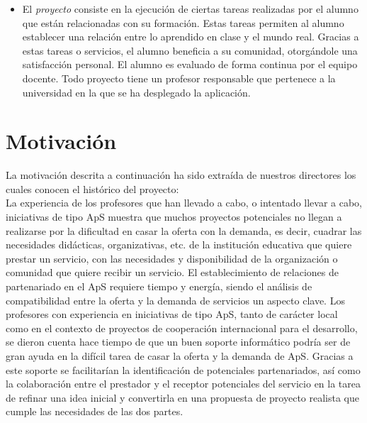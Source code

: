 \documentclass[11pt]{book}
\begin{document}
\begin{itemize}
		\item El \emph{proyecto} consiste en la ejecución de ciertas tareas realizadas por el alumno que están relacionadas con su formación. Estas tareas permiten al alumno establecer una relación entre lo aprendido en clase y el mundo real. Gracias a estas tareas o servicios, el alumno beneficia a su comunidad, otorgándole una satisfacción personal. El alumno es evaluado de forma continua por el equipo docente. Todo proyecto tiene un profesor responsable que pertenece a la universidad en la que se ha desplegado la aplicación.
	\end{itemize}
	\section{Motivación}\label{cap:cont-motidvacion}
	La motivación descrita a continuación ha sido extraída de nuestros directores los cuales conocen el histórico del proyecto:\\
	La experiencia de los profesores que han llevado a cabo, o intentado
	llevar a cabo, iniciativas de tipo ApS muestra
	que muchos proyectos potenciales no llegan a realizarse por la
	dificultad en casar la oferta con la demanda, es decir, cuadrar las
	necesidades didácticas, organizativas, etc. de la institución educativa
	que quiere prestar un servicio, con las necesidades y disponibilidad de
	la organización o comunidad que quiere recibir un servicio. El
	establecimiento de relaciones de partenariado en el ApS requiere tiempo
	y energía, siendo el análisis de compatibilidad entre la oferta y la
	demanda de servicios un aspecto clave. Los profesores con experiencia en
	iniciativas de tipo ApS, tanto de carácter local como en el contexto de
	proyectos de cooperación internacional para el desarrollo, se dieron
	cuenta hace tiempo de que un buen soporte informático podría ser de gran
	ayuda en la difícil tarea de casar la oferta y la demanda de ApS.
	Gracias a este soporte se facilitarían la identificación de potenciales
	partenariados, así como la colaboración entre el prestador y el receptor
	potenciales del servicio en la tarea de refinar una idea inicial y
	convertirla en una propuesta de proyecto realista que cumple las
	necesidades de las dos partes.\\\\
	
\end{document}
